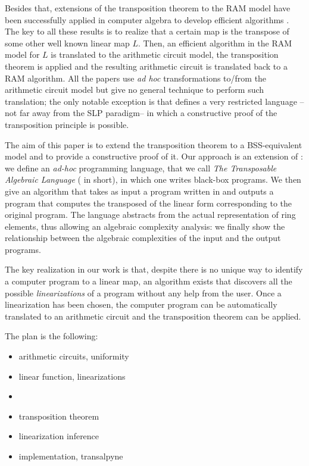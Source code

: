 Besides that, extensions of the transposition theorem to the RAM model
have been successfully applied in computer algebra to develop
efficient algorithms \cite{Sho95,shoup99,BoLeSc03,PS06,DFS09}. The key
to all these results is to realize that a certain map is the transpose
of some other well known linear map $L$. Then, an efficient algorithm
in the RAM model for $L$ is translated to the arithmetic circuit
model, the transposition theorem is applied and the resulting
arithmetic circuit is translated back to a RAM algorithm. All the
papers use \emph{ad hoc} transformations to/from the arithmetic
circuit model but give no general technique to perform such
translation; the only notable exception is \cite{BoLeSc03} that
defines a very restricted language --not far away from the SLP
paradigm-- in which a constructive proof of the transposition
principle is possible.

The aim of this paper is to extend the transposition theorem to a
BSS-equivalent model \cite{BSS} and to provide a constructive proof of
it. Our approach is an extension of \cite{BoLeSc03}: we define an
\emph{ad-hoc} programming language, that we call \emph{The
  Transposable Algebraic Language} (\tAL{} in short), in which one
writes black-box programs. We then give an algorithm that takes as
input a program written in \tAL{} and outputs a program that computes
the transposed of the linear form corresponding to the original
program. The language abstracts from the actual representation of ring
elements, thus allowing an algebraic complexity analysis: we finally
show the relationship between the algebraic complexities of the input
and the output programs.

The key realization in our work is that, despite there is no unique
way to identify a computer program to a linear map, an algorithm
exists that discovers all the possible \emph{linearizations} of a
program without any help from the user. Once a linearization has been
chosen, the computer program can be automatically translated to an
arithmetic circuit and the transposition theorem can be applied.

The plan is the following:
\begin{itemize}
\item arithmetic circuits, uniformity
\item linear function, linearizations
\item \tAL{}
\item transposition theorem
\item linearization inference
\item implementation, transalpyne
\end{itemize}


%
